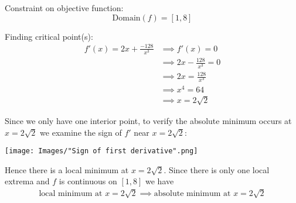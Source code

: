 \documentclass[nooutcomes]{ximera}
\begin{document}
\begin{problem}
\begin{enumerate}
\begin{freeResponse}
        Constraint on objective function:
        \[
          \text{Domain}(f) = [1, 8]
        \]

        Finding critical point(s):
        \begin{align*}
          f'(x) = 2x + \frac{-128}{x^3} &\implies f'(x) = 0 \\
          &\implies 2x - \frac{128}{x^3} = 0 \\
          &\implies 2x = \frac{128}{x^3} \\
          &\implies x^4 = 64 \\
          &\implies x = 2\sqrt{2}
        \end{align*}

        Since we only have one interior point, to verify the absolute minimum occurs at $x = 2\sqrt{2}$ we examine the sign of $f'$ near $x = 2\sqrt{2}$:
        \begin{image}
          \texttt{[image: Images/"Sign of first derivative".png]}
        \end{image}
        Hence there is a local minimum at $x = 2\sqrt{2}$.
        Since there is only one local extrema and $f$ is continuous on $[1, 8]$ we have
        \begin{align*}
          \mbox{local minimum at $x = 2\sqrt{2}$} \implies \mbox{absolute minimum at $x = 2\sqrt{2}$}
        \end{align*}
      \end{freeResponse}
  \end{enumerate}
\end{problem}
\end{document}
